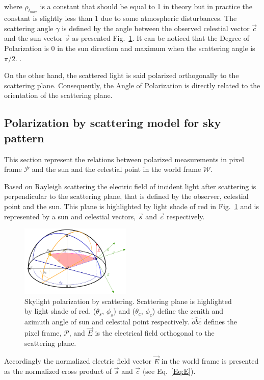 where $\rho_{l_{max}}$ is a constant that should be equal to 1 in theory but in practice
the constant is slightly less than 1 due to some atmospheric disturbances\cite{pomozi2001clearsky}.
The scattering angle $\gamma$ is defined by the angle between the observed celestial vector $\vec{c}$ and the sun 
vector $\vec{s}$ as presented Fig.~\ref{fig:scattering}. It can be noticed that
the Degree of Polarization is 0 in the sun direction and maximum when the scattering angle is $\pi/2$.
\cite{smith2007polarization, miyazaki09sunlightpolarization}.

On the other hand, the scattered light is said polarized orthogonally to the scattering plane.
Consequently, the Angle of Polarization is directly related to the orientation of the scattering plane.


\subsection{Polarization by scattering model for sky pattern}
\label{subsec:pscattering}
This section represent the relations between polarized measurements in pixel
frame $\mathcal{P}$ and the sun and the celestial point in the world frame
$\mathcal{W}$.

Based on Rayleigh scattering the electric field of incident light after
scattering is perpendicular to the scattering plane, that is defined by the
observer, celestial point and the sun.  This plane is highlighted by light
shade of red in Fig.~\ref{fig:scattering} and is represented by a sun and
celestial vectors, $\vec{s}$ and $\vec{c}$ respectively.

\begin{figure}
  \centering
  \includegraphics[width=0.47\textwidth]{./content/intro/figures/polasky-iros-small.png}
  \caption{Skylight polarization by scattering. Scattering plane is highlighted
  by light shade of red. ($\theta_s$, $\phi_s$) and ($\theta_c$, $\phi_c$)
  define the zenith and azimuth angle of sun and celestial point
  respectively. $\widehat{obc}$ defines the pixel frame, $\mathcal{P}$, and
  $\vec{E}$ is the electrical field orthogonal to the scattering plane.}
    \label{fig:scattering}
\end{figure}
Accordingly the normalized electric field vector $\vec{E}$ in the world frame
is presented as the normalized cross product of $\vec{s}$ and
$\vec{c}$ (see Eq.~\ref{Eq:E}).

